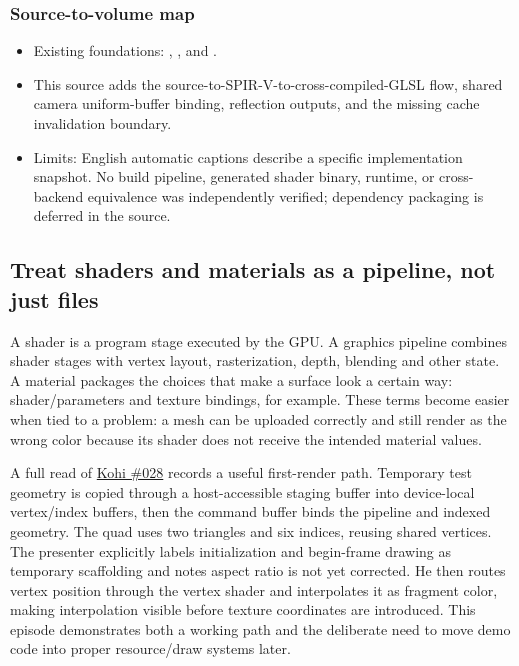 \subsubsection{Source-to-volume map}\label{06-engine-ii-ch026-source-to-volume-map}

\hypertarget{06-engine-ii-ch026-source-to-volume-map}{}

\begin{itemize}
\tightlist
\item
  Existing foundations: , , and .
\item
  This source adds the source-to-SPIR-V-to-cross-compiled-GLSL flow, shared camera uniform-buffer binding, reflection outputs, and the missing cache invalidation boundary.
\item
  Limits: English automatic captions describe a specific implementation snapshot. No build pipeline, generated shader binary, runtime, or cross-backend equivalence was independently verified; dependency packaging is deferred in the source.
\end{itemize}

\subsection{Treat shaders and materials as a pipeline, not just files}\label{06-engine-ii-ch026-treat-shaders-and-materials-as-a-pipeline-not-just-files}

\hypertarget{06-engine-ii-ch026-treat-shaders-and-materials-as-a-pipeline-not-just-files}{}

A shader is a program stage executed by the GPU. A graphics pipeline combines shader stages with vertex layout, rasterization, depth, blending and other state. A material packages the choices that make a surface look a certain way: shader/parameters and texture bindings, for example. These terms become easier when tied to a problem: a mesh can be uploaded correctly and still render as the wrong color because its shader does not receive the intended material values.

A full read of \href{https://www.youtube.com/watch?v=kgnc_hHVz_M}{Kohi \#028} records a useful first-render path. Temporary test geometry is copied through a host-accessible staging buffer into device-local vertex/index buffers, then the command buffer binds the pipeline and indexed geometry. The quad uses two triangles and six indices, reusing shared vertices. The presenter explicitly labels initialization and begin-frame drawing as temporary scaffolding and notes aspect ratio is not yet corrected. He then routes vertex position through the vertex shader and interpolates it as fragment color, making interpolation visible before texture coordinates are introduced. This episode demonstrates both a working path and the deliberate need to move demo code into proper resource/draw systems later.


